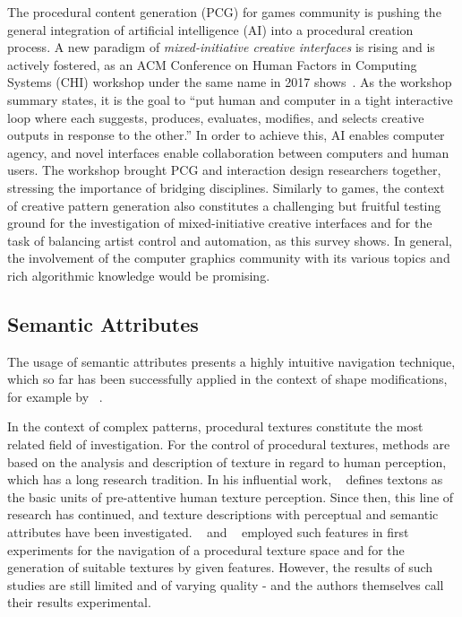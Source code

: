 The procedural content generation (PCG) for games community is pushing the general integration of artificial intelligence (AI) into a procedural creation process. A new paradigm of \textit{mixed-initiative creative interfaces} is rising and is actively fostered, as an ACM Conference on Human Factors in Computing Systems (CHI) workshop under the same name in 2017 shows~\cite{deterding_2017_mci}. As the workshop summary states, it is the goal to ``put human and computer in a tight interactive loop where each suggests, produces, evaluates, modifies, and selects creative outputs in response to the other.'' In order to achieve this, AI enables computer agency, and novel interfaces enable collaboration between computers and human users. The workshop brought PCG and interaction design researchers together, stressing the importance of bridging disciplines. Similarly to games, the context of creative pattern generation also constitutes a challenging but fruitful testing ground for the investigation of mixed-initiative creative interfaces and for the task of balancing artist control and automation, as this survey shows. In general, the involvement of the computer graphics community with its various topics and rich algorithmic knowledge would be promising.


\subsection{Semantic Attributes}
\label{subsec:analysis_outlook_semantic-attributes}

The usage of semantic attributes presents a highly intuitive navigation technique, which so far has been successfully applied in the context of shape modifications, for example by \citeauthor*{yumer_2015_sse}~\cite{yumer_2015_sse}.

In the context of complex patterns, procedural textures constitute the most related field of investigation. For the control of procedural textures, methods are based on the analysis and description of texture in regard to human perception, which has a long research tradition. In his influential work, \citeauthor*{julesz_1981_tte}~\cite{julesz_1981_tte} defines textons as the basic units of pre-attentive human texture perception. Since then, this line of research has continued, and texture descriptions with perceptual \cite{liu_2015_vpp} and semantic~\cite{matthews_2013_eta,cimpoi_2014_dtw} attributes have been investigated. \citeauthor*{dong_2017_ptg}~\cite{dong_2017_ptg} and \citeauthor*{liu_2018_ppt}~\cite{liu_2018_ppt} employed such features in first experiments for the navigation of a procedural texture space and for the generation of suitable textures by given features. %
However, the results of such studies are still limited and of varying quality - and the authors themselves \cite{liu_2018_ppt} call their results experimental.

